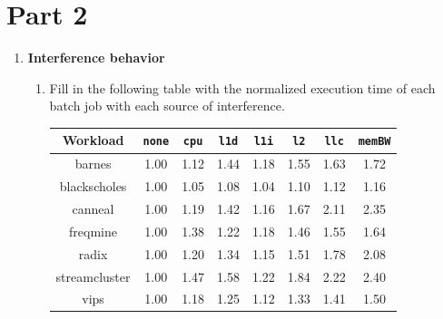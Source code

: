 \section*{Part 2}

\begin{enumerate}

    \item \textbf{Interference behavior}
    \begin{enumerate}
        \item Fill in the following table with the normalized execution time of each batch job with each source of interference.

        \begin{center}
        \begin{tabular}{ |c|c|c|c|c|c|c|c| }
        \hline
         \textbf{Workload} & \texttt{\textbf{none}} & \texttt{\textbf{cpu}} & \texttt{\textbf{l1d}} & \texttt{\textbf{l1i}} & \texttt{\textbf{l2}} & \texttt{\textbf{llc}} & \texttt{\textbf{memBW}}  \\
         \hline\hline
        barnes & 1.00 & \cellcolor{Green}1.12 & \cellcolor{YellowOrange}1.44 & \cellcolor{Green}1.18 & \cellcolor{YellowOrange}1.55 & \cellcolor{YellowOrange}1.63 & \cellcolor{YellowOrange}1.72 \\  \hline
        blackscholes & 1.00 & \cellcolor{Green}1.05 & \cellcolor{Green}1.08 & \cellcolor{Green}1.04 & \cellcolor{Green}1.10 & \cellcolor{Green}1.12 & \cellcolor{Green}1.16 \\  \hline
        canneal & 1.00 & \cellcolor{Green}1.19 & \cellcolor{YellowOrange}1.42 & \cellcolor{Green}1.16 & \cellcolor{YellowOrange}1.67 & \cellcolor{Red}2.11 & \cellcolor{Red}2.35 \\  \hline
        freqmine & 1.00 & \cellcolor{YellowOrange}1.38 & \cellcolor{Green}1.22 & \cellcolor{Green}1.18 & \cellcolor{YellowOrange}1.46 & \cellcolor{YellowOrange}1.55 & \cellcolor{YellowOrange}1.64 \\  \hline
        radix & 1.00 & \cellcolor{Green}1.20 & \cellcolor{YellowOrange}1.34 & \cellcolor{Green}1.15 & \cellcolor{YellowOrange}1.51 & \cellcolor{YellowOrange}1.78 & \cellcolor{Red}2.08 \\  \hline
        streamcluster & 1.00 & \cellcolor{YellowOrange}1.47 & \cellcolor{YellowOrange}1.58 & \cellcolor{Green}1.22 & \cellcolor{YellowOrange}1.84 & \cellcolor{Red}2.22 & \cellcolor{Red}2.40 \\  \hline
        vips & 1.00 & \cellcolor{Green}1.18 & \cellcolor{Green}1.25 & \cellcolor{Green}1.12 & \cellcolor{YellowOrange}1.33 & \cellcolor{YellowOrange}1.41 & \cellcolor{YellowOrange}1.50 \\  \hline
        \end{tabular}


\end{center}
\end{enumerate}
\end{enumerate}

